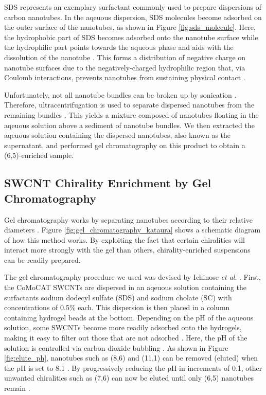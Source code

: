 SDS represents an exemplary surfactant commonly used to prepare dispersions of carbon nanotubes. In the aqeuous dispersion, SDS molecules become adsorbed on the outer surface of the nanotubes, as shown in Figure \ref{fig:sds_molecule}. Here, the hydrophobic part of SDS becomes adsorbed onto the nanotube surface while the hydrophilic part points towards the aqueous phase and aids with the dissolution of the nanotube \cite{richard2003supramolecular}. This forms a distribution of negative charge on nanotube surfaces due to the negatively-charged hydrophilic region that, via Coulomb interactions, prevents nanotubes from sustaining physical contact \cite{richard2003supramolecular}.


Unfortunately, not all nanotube bundles can be broken up by sonication \cite{o2002band}. Therefore, ultracentrifugation is used to separate dispersed nanotubes from the remaining bundles \cite{o2002band}. This yields a mixture composed of nanotubes floating in the aqeuous solution above a sediment of nanotube bundles. We then extracted the aqeuous solution containing the dispersed nanotubes, also known as the supernatant, and performed gel chromatography on this product to obtain a (6,5)-enriched sample.

\subsection{SWCNT Chirality Enrichment by Gel Chromatography}

Gel chromatography works by separating nanotubes according to their relative diameters \cite{liu2011large}. Figure \ref{fig:gel_chromatography_kataura} shows a schematic diagram of how this method works. By exploiting the fact that certain chiralities will interact more strongly with the gel than others, chirality-enriched suspensions can be readily prepared.

The gel chromatography procedure we used was devised by Ichinose \textit{et al}. \cite{ichinose2017extraction}. First, the CoMoCAT SWCNTs are dispersed in an aqeuous solution containing the surfactants sodium dodecyl sulfate (SDS) and sodium cholate (SC) with concentrations of 0.5\% each. This dispersion is then placed in a column containing hydrogel beads at the bottom. Depending on the pH of the aqueous solution, some SWCNTs become more readily adsorbed onto the hydrogels, making it easy to filter out those that are not adsorbed \cite{liu2011large}. Here, the pH of the solution is controlled via carbon dioxide bubbling \cite{ichinose2017extraction}. As shown in Figure \ref{fig:elute_ph}, nanotubes such as (8,6) and (11,1) can be removed (eluted) when the pH is set to 8.1 \cite{ichinose2017extraction}. By progressively reducing the pH in increments of 0.1, other unwanted chiralities such as (7,6) can now be eluted until only (6,5) nanotubes remain \cite{ichinose2017extraction}.

